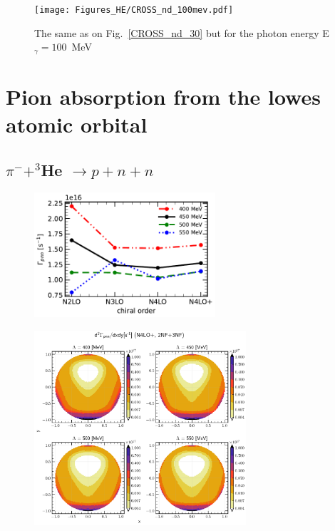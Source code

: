     \begin{figure}[h]
        \begin{center}
        \texttt{[image: Figures\_HE/CROSS\_nd\_100mev.pdf]}
        \end{center}
        \caption{The same as on Fig.~\ref{CROSS_nd_30} but 
        for the photon energy E$_\gamma=100$~MeV}
        \label{CROSS_nd_100}
    \end{figure}

    \clearpage
    \section{Pion absorption from the lowes atomic orbital}

    \subsection{$\pi^- + ^3$He $\rightarrow p + n + n$}

    \begin{figure}[h]
        \begin{center}
        \includegraphics[width=0.6\textwidth]{PlotData/PION/Dalitz_maps/figures/Gamma_pnn.pdf}
        \end{center}
        \caption{}
        \label{Gamma_pnn}
    \end{figure}

    \begin{figure}[h]
        \begin{center}
        \includegraphics[width=0.7\textwidth]{PlotData/PION/Dalitz_maps/figures/Dalitz_map_pnn_xy_cutofs.pdf}
        \end{center}
        \caption{}
        \label{pion_map_xy_cutoff}
    \end{figure}

